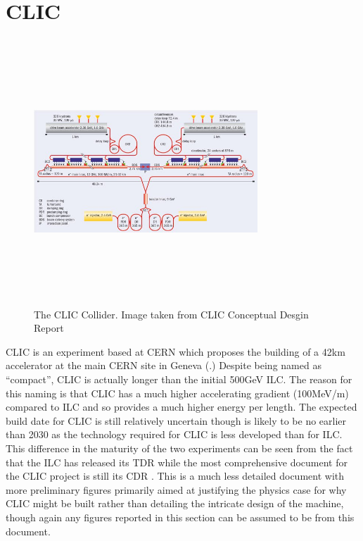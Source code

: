 \section{CLIC}
\begin{figure}
  \centering
  \includegraphics[width=0.75\textwidth,height=10cm,keepaspectratio]{Experiments/fig/clic}
  \caption[The CLIC Experiment]{The CLIC Collider. Image taken from CLIC Conceptual Desgin Report\cite{CDR}}
  \label{Fig:CLIC}
\end{figure}
\ac{CLIC} is an experiment based at CERN which proposes the building of a 42km accelerator at the main CERN site in Geneva (.) Despite being named as “compact”, \ac{CLIC} is actually longer than the initial 500GeV \ac{ILC}. The reason for this naming is that \ac{CLIC} has a much higher accelerating gradient (100MeV/m) compared to ILC and so provides a much higher energy per length. The expected build date for \ac{CLIC} is still relatively uncertain though is likely to be no earlier than 2030 as the technology required for \ac{CLIC} is less developed than for \ac{ILC}. This difference in the maturity of the two experiments can be seen from the fact that the \ac{ILC} has released its \ac{TDR} while the most comprehensive document for the CLIC project is still its \ac{CDR} \cite{CDR}.  This is a much less detailed document with more preliminary figures primarily aimed at justifying the physics case for why \ac{CLIC} might be built rather than detailing the intricate design of the machine, though again any figures reported in this section can be assumed to be from this document. 


